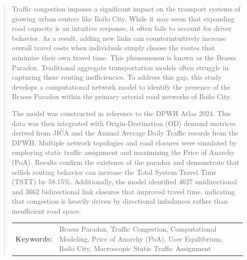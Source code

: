 
\begin{abstract}

Traffic congestion imposes a significant impact on the transport systems of growing urban centers like Iloilo City. While it may seem that expanding road capacity is an intuitive response, it often fails to account for driver behavior. As a result, adding new links can counterintuitively increase overall travel costs when individuals simply choose the routes that minimize their own travel time. This phenomenon is known as the Braess Paradox. Traditional aggregate transportation models often struggle in capturing these routing inefficiencies. To address this gap, this study develops a computational network model to identify the presence of the Braess Paradox within the primary arterial road networks of Iloilo City.

The model was constructed in reference to the DPWH Atlas 2024. This data was then integrated with Origin-Destination (OD) demand matrices derived from JICA and the Annual Average Daily Traffic records from the DPWH. Multiple network topologies and road closures were simulated by employing static traffic assignment and maximizing the Price of Anarchy (PoA). Results confirm the existence of the paradox and demonstrate that selfish routing behavior can increase the Total System Travel Time (TSTT) by 58.15\%. Additionally, the model identified 4627 unidirectional and 3662 bidirectional link closures that improved travel time, indicating that congestion is heavily driven by directional imbalances rather than insufficient road space. 


\begin{flushleft}
\begin{tabular}{lp{4.3in}}

\hspace{-0.5em}\textbf{Keywords:}\hspace{0.25em} & Braess Paradox, Traffic Congestion, Computational Modeling, Price of Anarchy (PoA), User Equilibrium, Iloilo City, Macroscopic Static Traffic Assignment

\\

\end{tabular}
\end{flushleft}
\end{abstract}
\restoregeometry